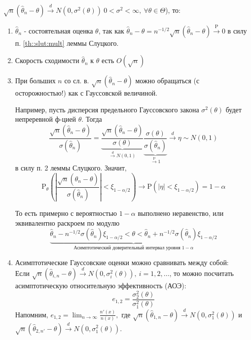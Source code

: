 \documentclass[12pt]{article}
\theoremstyle{basic_theorem}
\theoremstyle{name_theorem}
\def\P{ \mathrm{P} }
\begin{document}
\(\sqrt{n}(\widehat{\theta}_n - \theta) \xrightarrow{d} N(0, \sigma^2(\theta)) \ 0 < \sigma^2 < \infty,\ \forall \theta \in \Theta\)), то: \begin{enumerate}

    \item \(\widehat{\theta}_n\) - состоятельная оценка \(\theta\), так как \(\widehat{\theta}_n - \theta = n^{-1/2} \sqrt{n}(\widehat{\theta}_n - \theta) \xrightarrow{\P} 0\)
        в силу п. \ref{th::slut:mult} леммы Слуцкого.
    \item Скорость сходимости \(\widehat{\theta}_n\) к \(\theta\) есть \(O(\sqrt{n})\)
    \item При больших \(n\) со сл. в. \(\sqrt{n}(\widehat{\theta}_n - \theta)\) можно обращаться (с осторожностью!) как с Гауссовской величиной.

    Например, пусть дисперсия предельного Гауссовского закона \(\sigma^2(\theta)\) будет непреревной ф-цией \(\theta\). Тогда
        \[ \frac{\sqrt{n}(\widehat{\theta}_n - \theta)}{\sigma(\widehat{\theta}_n)} =
        \underbrace{\frac{\sqrt{n}(\widehat{\theta}_n - \theta)}{\sigma(\theta)}}_{\xrightarrow{d} N(0, 1)}
        \underbrace{\frac{\sigma(\theta)}{\sigma(\widehat{\theta}_n)}}_{\xrightarrow{\P} 1} \xrightarrow{d} \eta \sim N(0, 1)\]
        в силу п. 2 леммы Слуцкого. Значит,
        \[\P_\theta \left(\left\lvert \frac{\sqrt{n}(\widehat{\theta}_n - \theta)}{\sigma(\widehat{\theta}_n)} \right\rvert  < \xi_{1 - \alpha/2}\right) \rightarrow \P(\left\lvert \eta \right\rvert  < \xi_{1 - \alpha/2}) = 1 - \alpha\]

        То есть примерно с вероятностью \(1 - \alpha\) выполнено неравенство, или эквивалентно раскроем по модулю
        \[\underbrace{\widehat{\theta}_n - n^{-1/2}\sigma(\widehat{\theta}_n)\xi_{1 - \alpha /2} < \theta < \widehat{\theta}_n + n^{-1/2}\sigma(\widehat{\theta}_n)\xi_{1 - \alpha /2}}_{\mbox{Асимптотический доверительный интервал уровня \(1 - \alpha\)}}\]

    \item Асимптотические Гауссовские оценки можно сравнивать между собой: \\
    Если \(\sqrt{n} (\widehat{\theta}_{i,n} - \theta) \xrightarrow{d} N(0, \sigma^2_{i}(\theta)),\ i = 1, 2, \ldots\), то
    можно посчитать асимптотическую относительную эффективность (АОЭ):
    \[e_{1,2} = \frac{\sigma_2^2(\theta)}{\sigma_1^2(\theta)}\]
    Напомним, $e_{1, 2} = \lim_{n \to \infty} \frac{n'(x)}{n (x)}, \mbox{ где }
    \sqrt{n}(\widehat{\theta}_{1,n} - \theta) \xrightarrow{d} N(0, \sigma_1^2(\theta))$
    и \(\sqrt{n}(\widehat{\theta}_{2,n'} - \theta) \xrightarrow{d} N(0, \sigma_1^2(\theta))\).
\end{enumerate}
\end{document}
